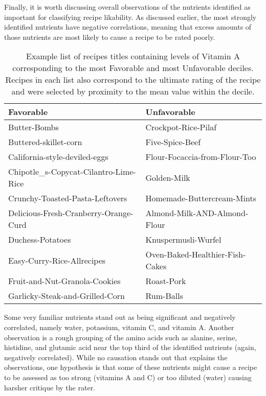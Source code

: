 \documentclass[]{scrartcl}
\begin{document}
Finally, it is worth discussing overall observations of the nutrients identified as important for classifying recipe likability.  As discussed earlier, the most strongly identified nutrients have negative correlations, meaning that excess amounts of those nutrients are most likely to cause a recipe to be rated poorly.  


\begin{table}
	\centering
	\caption{Example list of recipes titles containing levels of Vitamin A corresponding to the most Favorable and most Unfavorable deciles.  Recipes in each list also correspond to the ultimate rating of the recipe and were selected by proximity to the mean value within the decile.\label{tab:VITA}}
	\begin{tabular}{ll}
	   \textbf{Favorable} &  \textbf{Unfavorable}\\
	   \hline
	   Butter-Bombs & Crockpot-Rice-Pilaf\\
	   Buttered-skillet-corn & Five-Spice-Beef\\
	   California-style-deviled-eggs & Flour-Focaccia-from-Flour-Too\\
	   Chipotle\_s-Copycat-Cilantro-Lime-Rice & Golden-Milk\\
	   Crunchy-Toasted-Pasta-Leftovers & Homemade-Buttercream-Mints\\
	   Delicious-Fresh-Cranberry-Orange-Curd & Almond-Milk-AND-Almond-Flour\\
	   Duchess-Potatoes & Knuspermusli-Wurfel\\
       Easy-Curry-Rice-Allrecipes & Oven-Baked-Healthier-Fish-Cakes\\
       Fruit-and-Nut-Granola-Cookies & Roast-Pork\\
       Garlicky-Steak-and-Grilled-Corn &  Rum-Balls\\
	\end{tabular}
\end{table}


Some very familiar nutrients stand out as being significant and negatively correlated, namely water, potassium, vitamin C, and vitamin A.  Another observation is a rough grouping of the amino acids such as alanine, serine, histidine, and glutamic acid near the top third of the identified nutrients (again, negatively correlated).  While no causation stands out that explains the observations, one hypothesis is that some of these nutrients might cause a recipe to be assessed as too strong (vitamins A and C) or too diluted (water) causing harsher critique by the rater.  
\end{document}
